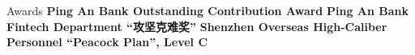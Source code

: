 \begin{rubric}{Awards}
\entry*[2023] \textbf{Ping An Bank Outstanding Contribution Award}
\entry*[2022] \textbf{Ping An Bank Fintech Department ``攻坚克难奖''}
\entry*[2021] \textbf{Shenzhen Overseas High-Caliber Personnel ``Peacock Plan'', Level C}
\end{rubric}